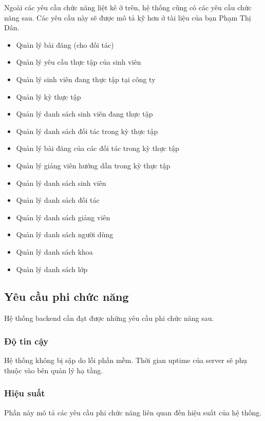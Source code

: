 \documentclass[./../main.tex]{subfiles}
\begin{document}
Ngoài các yêu cầu chức năng liệt kê ở trên, hệ thống cũng có các yêu cầu chức năng sau. Các yêu cầu này sẽ được mô tả kỹ hơn ở tài liệu của bạn Phạm Thị Dân.

\begin{itemize}
	\item Quản lý bài đăng (cho đối tác)
	\item Quản lý yêu cầu thực tập của sinh viên
	\item Quản lý sinh viên đang thực tập tại công ty
	\item Quản lý kỳ thực tập
	\item Quản lý danh sách sinh viên đang thực tập
	\item Quản lý danh sách đối tác trong kỳ thực tập
	\item Quản lý bài đăng của các đối tác trong kỳ thực tập
	\item Quản lý giảng viên hướng dẫn trong kỳ thực tập
	\item Quản lý danh sách sinh viên
	\item Quản lý danh sách đối tác
	\item Quản lý danh sách giảng viên
	\item Quản lý danh sách người dùng
	\item Quản lý danh sách khoa
	\item Quản lý danh sách lớp
\end{itemize}

\subsection{Yêu cầu phi chức năng}

Hệ thống backend cần đạt được những yêu cầu phi chức năng sau.

\hypertarget{ux111ux1ed9-tin-cux1eady}{%
	\subsubsection{Độ tin cậy}\label{ux111ux1ed9-tin-cux1eady}}

Hệ thống không bị sập do lỗi phần mềm. Thời gian uptime của server sẽ
phụ thuộc vào bên quản lý hạ tầng.

\hypertarget{hiux1ec7u-suux1ea5t}{%
	\subsubsection{Hiệu suất}\label{hiux1ec7u-suux1ea5t}}

Phần này mô tả các yêu cầu phi chức năng liên quan đến hiệu suất của hệ
thống.
\end{document}
